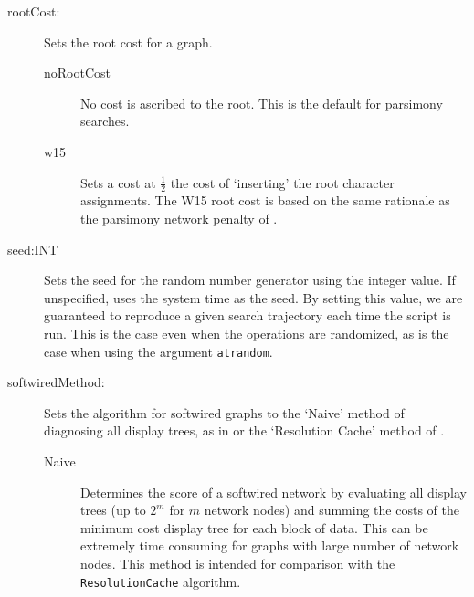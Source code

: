 \begin{description}

		\item[rootCost:] Sets the root cost for a graph. 	
				
		\begin{description}
			
			\item[noRootCost] No cost is ascribed to the root. This is the default for parsimony 
			searches.
			
			\item[w15] Sets a cost at $\frac{1}{2}$ the cost of `inserting' the root character 
			assignments. The W15 root cost is based on the same rationale as the parsimony 
			network penalty of \cite{Wheeler2015}.

		\end{description}
			 
		 \item[seed:INT] Sets the seed for the random number generator using the integer
		 value. If unspecified, \phyg uses the system time as the seed. By setting this value, 
		 we are guaranteed to reproduce a given search trajectory each time the script is run. 
		 This is the case even when the operations are randomized, as is the case when using 
		 the argument \texttt{atrandom}.
			 
		 \item[softwiredMethod:] Sets the algorithm for softwired graphs to the 
		 `Naive' method of diagnosing all display trees, as in \cite{Wheeler2015} or
		 the `Resolution Cache' method of \cite{WheelerandWashburn2023}.
		 
		\begin{description}
			
			\item[Naive] Determines the score of a softwired network by evaluating all display 
			trees (up to $2^m$ for $m$ network nodes) and summing the costs of the minimum 
			cost display tree for each block of data. This can be extremely time consuming for 
			graphs with large number of network nodes. This method is intended for comparison
			with the \texttt{ResolutionCache} algorithm.
			

\end{description}
\end{description}
